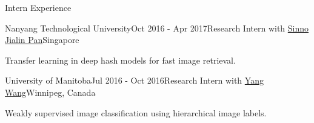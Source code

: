 \documentclass{resume} %
\begin{document}
\begin{rSection}{Intern Experience}
\begin{rSubsection}{Nanyang Technological University}{Oct 2016 - Apr 2017}{Research Intern with \href{https://personal.ntu.edu.sg/sinnopan/}{Sinno Jialin Pan}}{Singapore}
    \item Transfer learning in deep hash models for fast image retrieval.
    \end{rSubsection}


\begin{rSubsection}{University of Manitoba}{Jul 2016 - Oct 2016}{Research Intern with \href{https://www.cs.umanitoba.ca/~ywang/}{Yang Wang}}{Winnipeg, Canada}
    \item Weakly supervised image classification using hierarchical image labels.
    \end{rSubsection}

\end{rSection}

\end{document}
